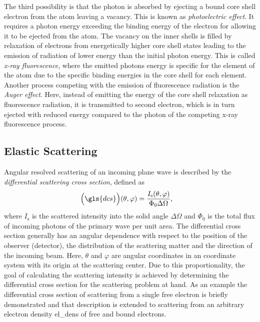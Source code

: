 \begin{description}
          {The third possibility is that the photon is absorbed by ejecting a bound core shell electron from the atom leaving a vacancy. This is known as \emph{photoelectric effect}. It requires a photon energy exceeding the binding energy of the electron for allowing it to be ejected from the atom. The vacancy on the inner shells is filled by relaxation of electrons from energetically higher core shell states leading to the emission of radiation of lower energy than the initial photon energy. This is called \emph{x-ray fluorescence}, where the emitted photons energy is specific for the element of the atom due to the specific binding energies in the core shell for each element. Another process competing with the emission of fluorescence radiation is the \emph{Auger effect}. Here, instead of emitting the energy of the core shell relaxation as fluorescence radiation, it is transmitted to second electron, which is in turn ejected with reduced energy compared to the photon of the competing x-ray fluorescence process.}
\end{description}

\subsection{Elastic Scattering} \label{ch_theo:sec_elastic_scattering}
Angular resolved scattering of an incoming plane wave is described by the \emph{differential scattering cross section}, defined as
\begin{align}
\Big(\gls{dcs}\Big)(\theta, \varphi) &= \frac{I_\text{s}(\theta, \varphi)}{\Phi_0 \Delta \Omega}\text{,}
\end{align}
where $I_\text{s}$ is the scattered intensity into the solid angle $\Delta \Omega$ and $\Phi_0$ is the total flux of incoming photons of the primary wave per unit area. The differential cross section generally has an angular dependence with respect to the position of the observer (detector), the distribution of the scattering matter and the direction of the incoming beam. Here, $\theta$ and $\varphi$ are angular coordinates in an coordinate system with its origin at the scattering center. Due to this proportionality, the goal of calculating the scattering intensity is achieved by determining the differential cross section for the scattering problem at hand. As an example the differential cross section of scattering from a single free electron is briefly demonstrated and that description is extended to scattering from an arbitrary electron density \gls{el_dens} of free and bound electrons.

